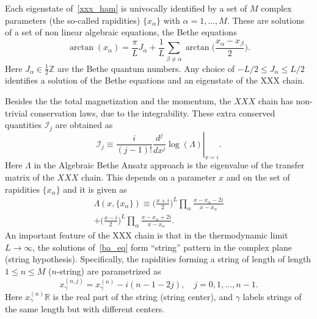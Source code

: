\documentclass[twocolumn,superscriptaddress,prb,10pt]{revtex4-1}
\begin{document}
Each eigenstate of~\eqref{xxx_ham} is univocally identified by a set of $M$ 
complex parameters (the so-called rapidities) $\{x_\alpha\}$ with 
$\alpha=1,\dots,M$. These are solutions of a set of non linear algebraic 
equations, the Bethe equations
%
\begin{equation}
\arctan(x_\alpha)=\frac{\pi}{L}J_\alpha+
\frac{1}{L}\sum\limits_{\beta\ne \alpha}\arctan\Big(\frac{
x_\alpha-x_\beta}{2}\Big).   
\label{ba_eq}
\end{equation}
%
Here $J_\alpha\in\frac{1}{2}\mathbb{Z}$ are the Bethe quantum numbers. 
Any choice of $-L/2\le J_\alpha\le L/2$ identifies a solution of the 
Bethe equations and an eigenstate of the XXX chain. 

Besides the the total magnetization and the momentum, the $XXX$ chain 
has non-trivial conservation laws, due to the integrability. These extra 
conserved quantities ${\mathcal I}_j$ are obtained as 
%
\begin{equation}
\left.{\mathcal I}_j\equiv\frac{i}{(j-1)!}\frac{d^j}{dx^j}\log(\Lambda)
\right|_{x=i}.
\end{equation}
%
Here $\Lambda$ in the Algebraic Bethe Ansatz approach is the eigenvalue 
of the transfer matrix of the $XXX$ chain. This depends on a parameter 
$x$ and on the set of rapidities $\{x_\alpha\}$  and it 
is given as 
%
\begin{multline}
\Lambda(x,\{x_\alpha\})\equiv\Big(\frac{x+i}{2}\Big)^L
\prod\limits_\alpha\frac{x-x_\alpha-2i}{x-x_\alpha}\\
+\Big(\frac{x-i}{2}\Big)^L
\prod\limits_\alpha\frac{x-x_\alpha+2i}{x-x_\alpha}. 
\end{multline}
%
An important feature of the XXX chain is that in the thermodynamic limit 
$L\to\infty$, the solutions of~\eqref{ba_eq} form ``string'' pattern in 
the complex plane (string hypothesis). Specifically, the rapidities 
forming a string of length of length $1\le n\le M$ ($n$-string) are 
parametrized as 
%
\begin{equation}
x_\gamma^{(n,j)}=x_\gamma^{(n)}-i(n-1-2j),\quad j=0,1,\dots,n-1.
\label{string_hyp}
\end{equation}
% 
Here $x_\gamma^{(n)}\mathbb{R}$ is the real part of the string 
(string center), and $\gamma$ labels strings of the same length but with 
different centers.
\end{document}
